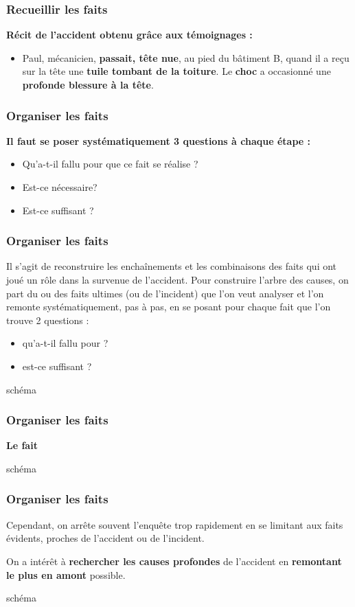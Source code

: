 \documentclass{beamer}
\begin{document}
\begin{frame}
\frametitle{Recueillir les faits}

\textbf{Récit de l’accident obtenu grâce aux témoignages :}
\begin{itemize}
	\item Paul, mécanicien, \textbf{passait, tête nue}, au pied du bâtiment B, quand il a reçu sur la tête une \textbf{tuile tombant de la toiture}. Le \textbf{choc} a occasionné une \textbf{profonde blessure à la tête}.
	\end{itemize}
\end{frame}

\begin{frame}
\frametitle{Organiser les faits}

\textbf{Il faut se poser systématiquement 3 questions à chaque étape :}
\begin{itemize}
	\item Qu’a-t-il fallu pour que ce fait se réalise ?
\item Est-ce nécessaire?
\item Est-ce suffisant ?
\end{itemize}
\end{frame}

\begin{frame}
\frametitle{Organiser les faits}

Il s’agit de reconstruire les enchaînements et les combinaisons des faits qui ont joué un rôle dans la survenue de l’accident.
Pour construire l’arbre des causes, on part du ou des faits ultimes (ou de l’incident) que l’on veut analyser et l’on remonte systématiquement, pas à pas, en se posant pour chaque fait que l’on trouve 2 questions :
\begin{itemize}
\item qu’a-t-il fallu pour ?
\item est-ce suffisant ?
\end{itemize}
schéma
\end{frame}

\begin{frame}
\frametitle{Organiser les faits}

\textbf{Le fait}

schéma
\end{frame}


\begin{frame}
\frametitle{Organiser les faits}

Cependant, on arrête souvent l’enquête trop rapidement en se limitant aux faits évidents, proches de l’accident ou de l’incident.

On a intérêt à \textbf{rechercher les causes profondes} de l’accident en\textbf{ remontant le plus en amont} possible.

schéma
\end{frame}
\end{document}

